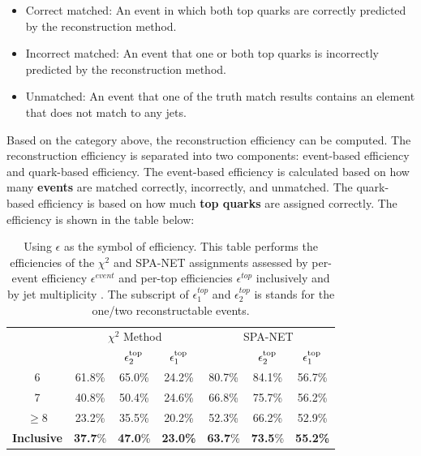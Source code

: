 \begin{itemize}
	\item Correct matched: An event in which both top quarks are correctly predicted by the reconstruction method.
	\item Incorrect matched: An event that one or both top quarks is incorrectly predicted by the reconstruction method.
	\item Unmatched: An event that one of the truth match results contains an element that does not match to any jets.
\end{itemize}
Based on the category above, the reconstruction efficiency can be computed. The reconstruction efficiency is separated into two components: event-based efficiency and quark-based efficiency. The event-based efficiency is calculated based on how many \textbf{events} are matched correctly, incorrectly, and unmatched. The quark-based efficiency is based on how much \textbf{top quarks} are assigned correctly. The efficiency is shown in the table below:
\\
\begin{table}[H]
	\caption{Using $\epsilon$ as the symbol of efficiency. This table performs the efficiencies of the $\chi^2$ and SPA-NET assignments assessed by per-event efficiency $\epsilon^{event}$ and per-top efficiencies $\epsilon^{top}$ inclusively and by jet multiplicity \Njets. The subscript of $\epsilon^{top}_{1}$ and $\epsilon^{top}_{2}$ is stands for the one/two reconstructable events.}
	\centering
	\begin{tabular}{c c  c  c  c c  c}
		\hline
		\hline
		& \multicolumn{3}{c}{$\chi^2$ Method} & \multicolumn{3}{c}{SPA-NET }\\
		\hspace{0.2cm}\Njets & \hspace{0.15cm} \epsevent & $\epsilon^\mathrm{top}_2$ & \hspace{0.15cm} $\epsilon^\mathrm{top}_1$ \hspace{0.15cm} & \hspace{0.15cm} \epsevent & $\epsilon^\mathrm{top}_2$ & \hspace{0.15cm} $\epsilon^\mathrm{top}_1$ \hspace{0.15cm}   \\
		\midrule
		6          & 61.8\% & 65.0\% & 24.2\% & 80.7\% & 84.1\% & 56.7\% \\
		7          & 40.8\% & 50.4\% & 24.6\% & 66.8\% & 75.7\% & 56.2\% \\
		$\geq$8    & 23.2\% & 35.5\% & 20.2\% & 52.3\% & 66.2\% & 52.9\% \\
		\midrule     
		\vspace{0.2cm}
		\textbf{Inclusive}  &\textbf{ 37.7}\% & \textbf{47.0}\% & \textbf{23.0\%} & \textbf{63.7}\% &\textbf{73.5}\% &\textbf{55.2\%} \\
		\hline
	\end{tabular}
	\label{tab:eps}
\end{table}

